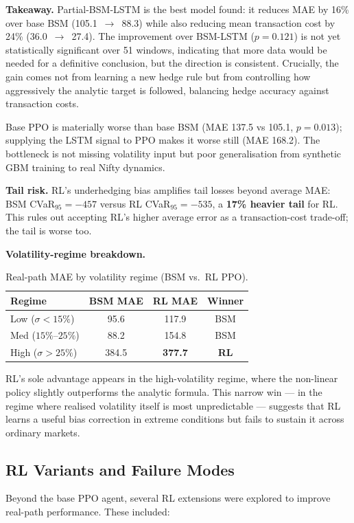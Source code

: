 \documentclass[10pt,a4paper]{article}
\begin{document}
\textbf{Takeaway.} Partial-BSM-LSTM is the best model found: it reduces MAE
by 16\% over base BSM (105.1~$\to$~88.3) while also reducing mean transaction cost
by 24\% (36.0~$\to$~27.4).  The improvement over BSM-LSTM ($p=0.121$) is not
yet statistically significant over 51 windows, indicating that more data would
be needed for a definitive conclusion, but the direction is consistent.
Crucially, the gain comes not from learning a new hedge rule but from
controlling how aggressively the analytic target is followed, balancing
hedge accuracy against transaction costs.

Base PPO is materially worse than base BSM (MAE 137.5 vs 105.1, $p=0.013$);
supplying the LSTM signal to PPO makes it worse still (MAE 168.2).
The bottleneck is not missing volatility input but poor generalisation from
synthetic GBM training to real Nifty dynamics.

\textbf{Tail risk.}  RL's underhedging bias amplifies tail losses beyond
average MAE: BSM CVaR$_{95}=-457$ versus RL CVaR$_{95}=-535$, a
\textbf{17\% heavier tail} for RL.  This rules out accepting RL's higher
average error as a transaction-cost trade-off; the tail is worse too.

\textbf{Volatility-regime breakdown.}
\begin{table}[H]
\centering
\caption{Real-path MAE by volatility regime (BSM vs.\ RL PPO).}
\label{tab:regime}
\begin{tabular}{lccc}
\toprule
Regime & BSM MAE & RL MAE & Winner \\
\midrule
Low  ($\sigma < 15\%$)   & 95.6  & 117.9 & BSM \\
Med  ($15\%$--$25\%$)    & 88.2  & 154.8 & BSM \\
High ($\sigma > 25\%$)   & 384.5 & \textbf{377.7} & \textbf{RL} \\
\bottomrule
\end{tabular}
\end{table}

RL's sole advantage appears in the high-volatility regime, where the
non-linear policy slightly outperforms the analytic formula.  This
narrow win --- in the regime where realised volatility itself is most
unpredictable --- suggests that RL learns a useful bias correction in
extreme conditions but fails to sustain it across ordinary markets.

\subsection*{RL Variants and Failure Modes}
Beyond the base PPO agent, several RL extensions were explored to improve
real-path performance. These included:
\end{document}
